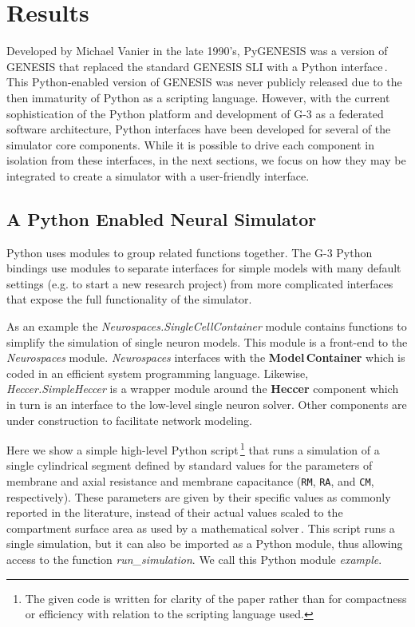 \documentclass[12pt]{article}
\begin{document}
\section{Results}

Developed by Michael Vanier in the late 1990's, PyGENESIS was a
version of GENESIS that replaced the standard GENESIS SLI with a
Python interface\,\cite{vanier97:_genes_python}.  This Python-enabled
version of GENESIS was never publicly released due to the then
immaturity of Python as a scripting language.  However, with the
current sophistication of the Python platform and development of G-3
as a federated software architecture, Python interfaces have been
developed for several of the simulator core components.  While it is
possible to drive each component in isolation from these interfaces,
in the next sections, we focus on how they may be integrated to create
a simulator with a user-friendly interface.

\subsection{A Python Enabled Neural Simulator}
\label{ss-apens}

Python uses modules to group related functions together.  The G-3 Python
bindings use modules to separate interfaces for
simple models with many default settings (e.g. to start a new research
project) from more complicated interfaces that expose the full
functionality of the simulator.

As an example the {\it Neurospaces.SingleCellContainer} module
contains functions to simplify the simulation of single neuron models.
This module is a front-end to the {\it Neurospaces} module.  {\it
  Neurospaces} interfaces with the {\bf Model\,Container} which is coded in
an efficient system programming language.  Likewise, {\it
  Heccer.SimpleHeccer} is a wrapper module around the {\bf Heccer}
component which in turn is an interface to the low-level single neuron
solver.  Other components are under construction to facilitate network
modeling.

Here we show a simple high-level Python script\,\footnote{The given code
  is written for clarity of the paper rather than for compactness or
  efficiency with relation to the scripting language used.} that runs
a simulation of a single cylindrical segment defined by standard
values for the parameters of membrane and axial resistance and
membrane capacitance ({\tt RM}, {\tt RA},
and {\tt CM}, respectively).  These parameters are given by their
specific values as commonly reported in the literature, instead of
their actual values scaled to the compartment surface area as used by
a mathematical solver\,\cite{cornelis04:_neuros_param_handl}. This
script runs a single simulation, but it can also be imported as a
Python module, thus allowing access to the function {\it
  run\_simulation}.  We call this Python module {\it example}.
\end{document}
